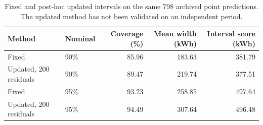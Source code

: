 \begin{table}[!htbp]\centering\small
\caption{Fixed and post-hoc updated intervals on the same 798 archived point predictions. The updated method has not been validated on an independent period.}\label{tab:intervals}
\begin{tabular}{@{}llrrr@{}}\toprule
Method & Nominal & Coverage (\%) & Mean width (kWh) & Interval score (kWh)\\\midrule
Fixed & 90\% & 85.96 & 183.63 & 381.79\\
Updated, 200 residuals & 90\% & 89.47 & 219.74 & 377.51\\
Fixed & 95\% & 93.23 & 258.85 & 497.64\\
Updated, 200 residuals & 95\% & 94.49 & 307.64 & 496.48\\\bottomrule
\end{tabular}\end{table}
